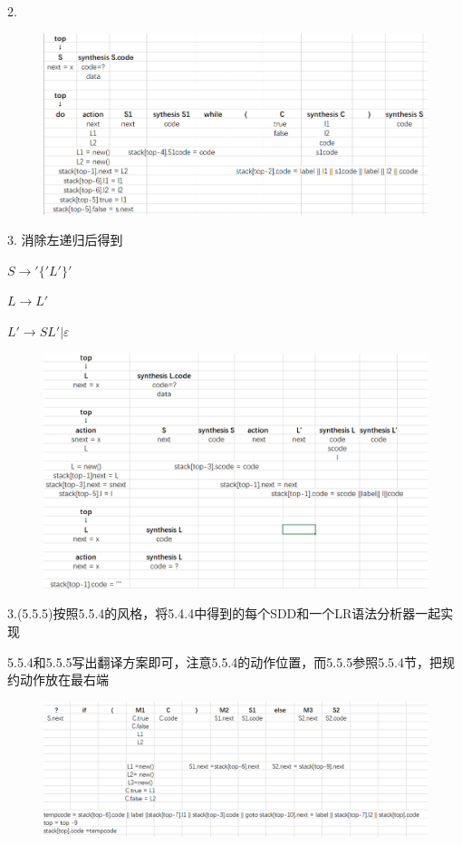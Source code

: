 \documentclass[a4paper, 10pt]{article}
\begin{document}
2. 
\begin{figure}[H]
\centering
\includegraphics[scale=0.6]{chapter5_hw3_2}
\end{figure}


3. 消除左递归后得到

$S \rightarrow '\{' L  '\}'$

$L \rightarrow L'$

$L' \rightarrow SL' | \varepsilon$

\begin{figure}[H]
\centering
\includegraphics[scale=0.6]{chapter5_hw3_3}
\end{figure}


3.(5.5.5)按照5.5.4的风格，将5.4.4中得到的每个SDD和一个LR语法分析器一起实现

5.5.4和5.5.5写出翻译方案即可，注意5.5.4的动作位置，而5.5.5参照5.5.4节，把规约动作放在最右端

\begin{figure}[H]
\centering
\includegraphics[scale=0.6]{chapter5_hw3_4}
\end{figure}
\end{document}
